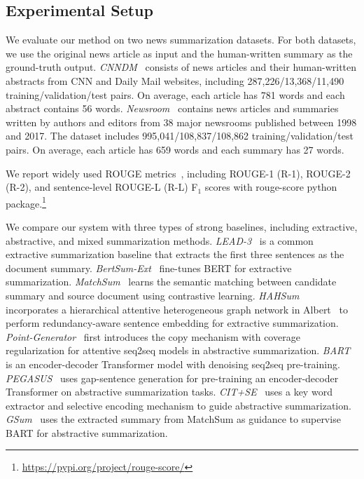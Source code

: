 \documentclass[11pt]{article}
\newcommand{\stitle}[1]{\vspace{1ex} \noindent{\bf #1.}}
\begin{document}
\subsection{Experimental Setup}\label{sec:setup}
\stitle{Datasets} 
We evaluate our method on two news summarization datasets. For both datasets, we use the original news article as input and the human-written summary as the ground-truth output.
\textit{CNNDM}~\cite{see2017get} consists of news articles and their human-written abstracts from CNN and Daily Mail websites, including 287,226/13,368/11,490 training/validation/test pairs.
On average, each article has 781 words and each abstract contains 56 words.
\textit{Newsroom}~\cite{grusky2018newsroom} contains news articles and summaries written by authors and editors from 38 major newsrooms published between 1998 and 2017. The dataset includes 995,041/108,837/108,862 training/validation/test pairs. On average, each article has 659 words and each summary has 27 words.


\stitle{Metrics}
We report widely used ROUGE metrics~\cite{lin2004rouge}, including ROUGE-1 (R-1), ROUGE-2 (R-2), and sentence-level ROUGE-L (R-L) F$_1$ scores with rouge-score python package.\footnote{\url{https://pypi.org/project/rouge-score/}}

\stitle{Baselines}
We compare our system with three types of strong baselines, including extractive, abstractive, and mixed summarization methods.
\textit{LEAD-3}~\cite{see2017get} is a common extractive summarization baseline that extracts the first three sentences as the document summary.
\textit{BertSum-Ext}~\cite{liu2019fine} fine-tunes BERT for extractive summarization.
\textit{MatchSum}~\cite{zhong2020extractive} learns the semantic matching between candidate summary and source document using contrastive learning.
\textit{HAHSum}~\cite{jia2020neural} incorporates a hierarchical attentive heterogeneous graph network in Albert~\cite{lan2019albert} to perform redundancy-aware sentence embedding for extractive summarization.
\textit{Point-Generator}~\cite{see2017get} first introduces the copy mechanism with coverage regularization for attentive seq2seq models in abstractive summarization. 
\textit{BART}~\cite{lewis2020bart} is an encoder-decoder Transformer model with denoising seq2seq pre-training.
\textit{PEGASUS}~\cite{zhang2020pegasus} uses gap-sentence generation for pre-training an encoder-decoder Transformer on abstractive summarization tasks.
\textit{CIT+SE}~\cite{saito2020abstractive} uses a key word extractor and selective encoding mechanism to guide abstractive summarization.
\textit{GSum}~\cite{dou2021gsum} uses the extracted summary from MatchSum as guidance to supervise BART for abstractive summarization.
\end{document}
